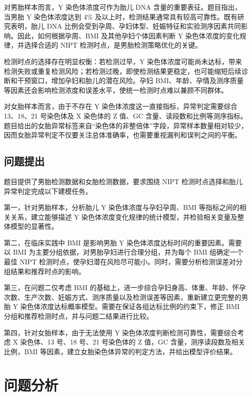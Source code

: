 \documentclass[UTF8,zihao=-4]{ctexart}
\numberwithin{equation}{section}
\begin{document}
对男胎样本而言，Y 染色体浓度可作为胎儿 DNA 含量的重要表征。题目指出，当男胎 Y 染色体浓度达到 4\% 及以上时，检测结果通常具有较高可靠性\cite{contest2025c}。既有研究表明，胎儿 DNA 比例会受到孕周、孕妇体型、妊娠特征和实验测序因素共同影响\cite{hui2020,deng2022}。因此，如何根据孕周、BMI 及其他孕妇个体因素判断 Y 染色体浓度的变化规律，并选择合适的 NIPT 检测时点，是男胎检测策略优化的关键。

检测时点的选择存在明显权衡：若检测过早，Y 染色体浓度可能尚未达标，带来检测失败或重复检测风险；若检测过晚，即使检测结果更稳定，也可能缩短后续诊断和干预窗口，增加孕妇和胎儿的潜在风险。孕妇 BMI、年龄、孕情及测序质量等因素还会影响检测浓度和误差水平，使统一检测时点难以兼顾不同群体。

对女胎样本而言，由于不存在 Y 染色体浓度这一直接指标，异常判定需要综合 13、18、21 号染色体及 X 染色体的 Z 值、GC 含量、读段数和比例等测序指标。题目给出的女胎异常标签来自“染色体的非整倍体”字段，异常样本数量相对较少，因而女胎异常判定不仅要关注总体准确率，也需要重视漏判和误判之间的平衡。

\subsection{问题提出}

题目提供了男胎检测数据和女胎检测数据，要求围绕 NIPT 检测时点选择和胎儿异常判定完成以下建模任务。

第一，针对男胎样本，分析胎儿 Y 染色体浓度与孕妇孕周、BMI 等指标之间的相关关系，建立能够描述 Y 染色体浓度变化规律的统计模型，并检验相关变量及整体模型的显著性。

第二，在临床实践中 BMI 是影响男胎 Y 染色体浓度达标时间的重要因素。需要以 BMI 为主要分组依据，对男胎孕妇进行合理分组，并为每个 BMI 组确定一个最佳 NIPT 检测时点，使孕妇潜在风险尽可能小。同时，需要分析检测误差对分组结果和推荐时点的影响。

第三，在问题二仅考虑 BMI 的基础上，进一步综合孕妇身高、体重、年龄、怀孕次数、生产次数、妊娠方式、测序质量以及检测误差等因素，重新建立更完整的男胎 Y 染色体浓度达标概率模型。需要在保证各组达标比例的约束下，修正 BMI 分组和推荐检测时点，并与问题二结果进行比较。

第四，针对女胎样本，由于无法使用 Y 染色体浓度判断检测可靠性，需要综合考虑 X 染色体、13 号、18 号、21 号染色体的 Z 值，GC 含量，测序读段数及相关比例，BMI 等因素，建立女胎染色体异常的判定方法，并给出模型评价结果。

\section{问题分析}
\end{document}
